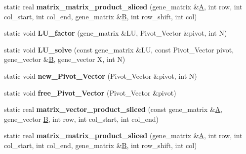 \begin{DoxyCompactItemize}
\item 
\mbox{\label{classblitz___l_u__solve__interface_afebfcffc1b05ad809cc704a0aa54a26e}} 
static real {\bfseries matrix\+\_\+matrix\+\_\+product\+\_\+sliced} (gene\+\_\+matrix \&\hyperlink{group___core___module_class_eigen_1_1_matrix}{A}, int row, int col\+\_\+start, int col\+\_\+end, gene\+\_\+matrix \&\hyperlink{group___core___module_class_eigen_1_1_matrix}{B}, int row\+\_\+shift, int col)
\item 
\mbox{\label{classblitz___l_u__solve__interface_a35ac67142990402c20597bf9a8d8d9b9}} 
static void {\bfseries L\+U\+\_\+factor} (gene\+\_\+matrix \&LU, Pivot\+\_\+\+Vector \&pivot, int N)
\item 
\mbox{\label{classblitz___l_u__solve__interface_acb9e0965fe92bb88c1b6d4e2a78906be}} 
static void {\bfseries L\+U\+\_\+solve} (const gene\+\_\+matrix \&LU, const Pivot\+\_\+\+Vector pivot, gene\+\_\+vector \&\hyperlink{group___core___module_class_eigen_1_1_matrix}{B}, gene\+\_\+vector X, int N)
\item 
\mbox{\label{classblitz___l_u__solve__interface_adafba612b512655463cd9d1fa7239d8c}} 
static void {\bfseries new\+\_\+\+Pivot\+\_\+\+Vector} (Pivot\+\_\+\+Vector \&pivot, int N)
\item 
\mbox{\label{classblitz___l_u__solve__interface_ae58840dbbcb44f84500e26d0a212b219}} 
static void {\bfseries free\+\_\+\+Pivot\+\_\+\+Vector} (Pivot\+\_\+\+Vector \&pivot)
\item 
\mbox{\label{classblitz___l_u__solve__interface_a9ffd8f9541d9559c4b0f6d0532587e76}} 
static real {\bfseries matrix\+\_\+vector\+\_\+product\+\_\+sliced} (const gene\+\_\+matrix \&\hyperlink{group___core___module_class_eigen_1_1_matrix}{A}, gene\+\_\+vector \hyperlink{group___core___module_class_eigen_1_1_matrix}{B}, int row, int col\+\_\+start, int col\+\_\+end)
\item 
\mbox{\label{classblitz___l_u__solve__interface_afebfcffc1b05ad809cc704a0aa54a26e}} 
static real {\bfseries matrix\+\_\+matrix\+\_\+product\+\_\+sliced} (gene\+\_\+matrix \&\hyperlink{group___core___module_class_eigen_1_1_matrix}{A}, int row, int col\+\_\+start, int col\+\_\+end, gene\+\_\+matrix \&\hyperlink{group___core___module_class_eigen_1_1_matrix}{B}, int row\+\_\+shift, int col)

\end{DoxyCompactItemize}
